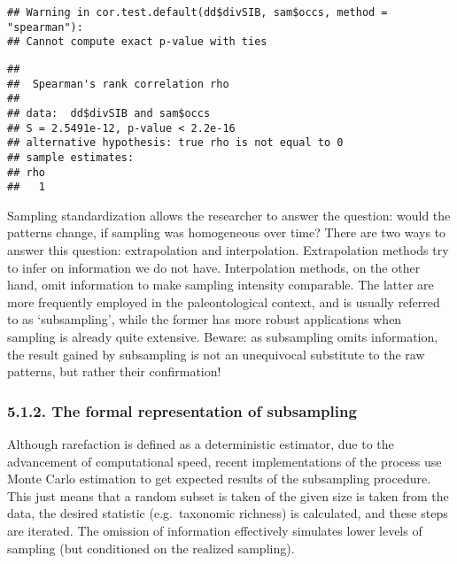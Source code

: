 \documentclass[]{article}
\newenvironment{Shaded}{\begin{snugshade}}{\end{snugshade}}
\newcommand{\DataTypeTok}[1]{\textcolor[rgb]{0.13,0.29,0.53}{#1}}
\newcommand{\KeywordTok}[1]{\textcolor[rgb]{0.13,0.29,0.53}{\textbf{#1}}}
\newcommand{\NormalTok}[1]{#1}
\newcommand{\OperatorTok}[1]{\textcolor[rgb]{0.81,0.36,0.00}{\textbf{#1}}}
\newcommand{\StringTok}[1]{\textcolor[rgb]{0.31,0.60,0.02}{#1}}
\begin{document}
\begin{Shaded}
\end{Shaded}

\begin{verbatim}
## Warning in cor.test.default(dd$divSIB, sam$occs, method = "spearman"):
## Cannot compute exact p-value with ties
\end{verbatim}

\begin{verbatim}
## 
##  Spearman's rank correlation rho
## 
## data:  dd$divSIB and sam$occs
## S = 2.5491e-12, p-value < 2.2e-16
## alternative hypothesis: true rho is not equal to 0
## sample estimates:
## rho 
##   1
\end{verbatim}

Sampling standardization allows the researcher to answer the question:
would the patterns change, if sampling was homogeneous over time? There
are two ways to answer this question: extrapolation and interpolation.
Extrapolation methods try to infer on information we do not have.
Interpolation methods, on the other hand, omit information to make
sampling intensity comparable. The latter are more frequently employed
in the paleontological context, and is usually referred to as
`subsampling', while the former has more robust applications when
sampling is already quite extensive. Beware: as subsampling omits
information, the result gained by subsampling is not an unequivocal
substitute to the raw patterns, but rather their confirmation!

\hypertarget{the-formal-representation-of-subsampling}{%
\subsubsection{5.1.2. The formal representation of
subsampling}\label{the-formal-representation-of-subsampling}}

Although rarefaction is defined as a deterministic estimator, due to the
advancement of computational speed, recent implementations of the
process use Monte Carlo estimation to get expected results of the
subsampling procedure. This just means that a random subset is taken of
the given size is taken from the data, the desired statistic
(e.g.~taxonomic richness) is calculated, and these steps are iterated.
The omission of information effectively simulates lower levels of
sampling (but conditioned on the realized sampling).
\end{document}

